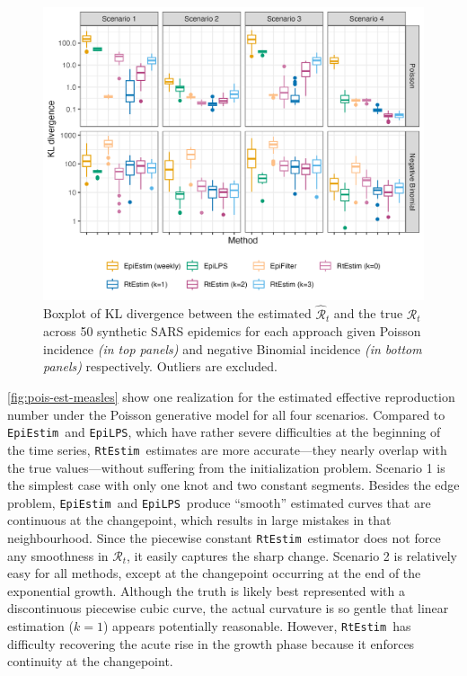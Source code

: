\documentclass[10pt,letterpaper]{article}
\def\RtEstim{\texttt{RtEstim}}
\def\EpiEstim{\texttt{EpiEstim}}
\def\EpiLPS{\texttt{EpiLPS}}
\def\calR{\mathcal{R}}
\begin{document}
\begin{figure}[!ht]
  \centering
  \includegraphics[width=.99\textwidth]{fig/fig_kl_week_sars.png}
  \caption{Boxplot of KL divergence between the estimated 
  $\hat{\calR}_t$ and the true $\calR_t$ across 50 synthetic SARS epidemics for 
  each approach given Poisson incidence \textit{(in top panels)} and negative 
  Binomial incidence \textit{(in bottom panels)} respectively.  
  Outliers are excluded.} 
  \label{fig:kl-res-sars}
\end{figure}

\autoref{fig:pois-est-measles} show one realization for the estimated effective reproduction
number under the Poisson generative model for all four scenarios. Compared to
\EpiEstim\ and \EpiLPS, which have rather severe difficulties at the beginning
of the time series, \RtEstim\ estimates are more accurate---they nearly
overlap with the true values---without suffering from the initialization
problem. Scenario
1 is the simplest case with only one knot and two constant segments. Besides the
edge problem, \EpiEstim\ and \EpiLPS\ produce ``smooth'' estimated curves that
are continuous at the changepoint, which results in large mistakes in that
neighbourhood. Since the piecewise constant \RtEstim\ estimator does not force
any smoothness in $\calR_t$, it easily captures the sharp change. 
Scenario 2 is relatively easy for all methods, except at the changepoint 
occurring at the end of the exponential growth. Although the truth is
likely best represented with a discontinuous piecewise cubic curve, the actual
curvature is so gentle that linear estimation ($k=1$) appears potentially
reasonable. However,
\RtEstim\ has difficulty recovering the acute rise in the
growth phase because it enforces continuity at the changepoint. 
\end{document}
